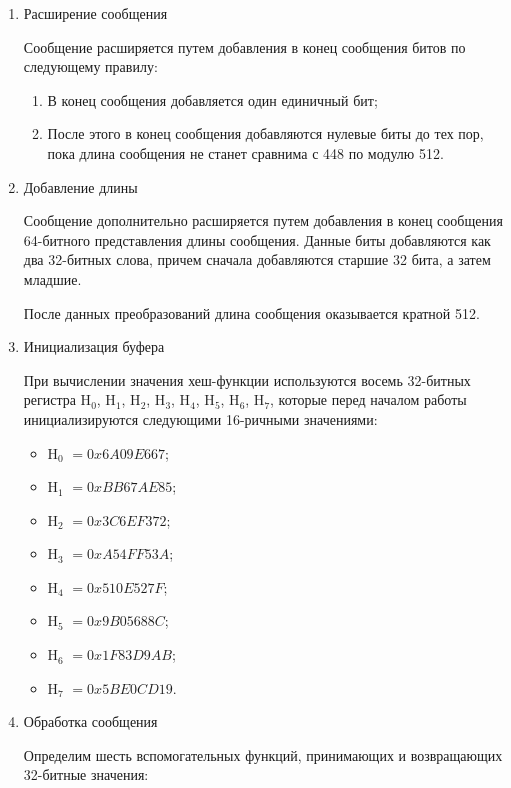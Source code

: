 \documentclass{./civarticle}
\begin{document}
\begin{enumerate}
    \item Расширение сообщения

    Сообщение расширяется путем добавления в конец сообщения битов по следующему правилу:

    \begin{enumerate}
        \item В конец сообщения добавляется один единичный бит;
        \item После этого в конец сообщения добавляются нулевые биты до тех пор, пока длина сообщения не станет сравнима с 448 по модулю 512.
    \end{enumerate}

    \item Добавление длины

    Сообщение дополнительно расширяется путем добавления в конец сообщения 64-битного представления длины сообщения. Данные биты добавляются как два 32-битных слова, причем сначала добавляются старшие 32 бита, а затем младшие.

    После данных преобразований длина сообщения оказывается кратной 512.

    \item Инициализация буфера

    При вычислении значения хеш-функции используются восемь 32-битных регистра H$_0$, H$_1$, H$_2$, H$_3$, H$_4$, H$_5$, H$_6$, H$_7$, которые перед началом работы инициализируются следующими 16-ричными значениями:

    \begin{itemize}
        \item H$_0$ $= 0x6A09E667$;
        \item H$_1$ $= 0xBB67AE85$;
        \item H$_2$ $= 0x3C6EF372$;
        \item H$_3$ $= 0xA54FF53A$;
        \item H$_4$ $= 0x510E527F$;
        \item H$_5$ $= 0x9B05688C$;
        \item H$_6$ $= 0x1F83D9AB$;
        \item H$_7$ $= 0x5BE0CD19$.
    \end{itemize}


    \item Обработка сообщения

    Определим шесть вспомогательных функций, принимающих и возвращающих 32-битные значения:


\end{enumerate}
\end{document}
